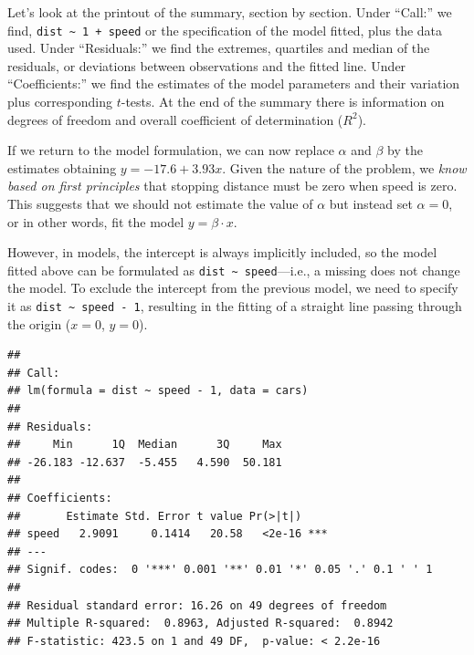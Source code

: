 \documentclass[krantz2]{krantz}\usepackage{knitr}
\begin{document}
Let's look at the printout of the summary, section by section. Under ``Call:'' we find, \verb|dist ~ 1 + speed| or the specification of the model fitted, plus the data used. Under ``Residuals:'' we find the extremes, quartiles and median of the residuals, or deviations between observations and the fitted line. Under ``Coefficients:'' we find the estimates of the model parameters and their variation plus corresponding $t$-tests. At the end of the summary there is information on degrees of freedom and overall coefficient of determination ($R^2$).

If we return to the model formulation, we can now replace $\alpha$ and $\beta$ by the estimates obtaining $y = -17.6 + 3.93 x$. Given the nature of the problem, we \emph{know based on first principles} that stopping distance must be zero when speed is zero. This suggests that we should not estimate the value of $\alpha$ but instead set $\alpha = 0$, or in other words, fit the model $y = \beta \cdot x$.

However, in \Rlang models, the intercept is always implicitly included, so the model fitted above can be formulated as \verb|dist ~ speed|---i.e., a missing  does not change the model. To exclude the intercept from the previous model, we need to specify it as \verb|dist ~ speed - 1|, resulting in the fitting of a straight line passing through the origin ($x = 0$, $y = 0$).

\begin{knitrout}\footnotesize
{}\color{fgcolor}\begin{kframe}
\begin{alltt}
 \hlkwb{<-}  \hlopt{~}  \hlopt{-} \hlstd{,}  
\end{alltt}
\begin{verbatim}
## 
## Call:
## lm(formula = dist ~ speed - 1, data = cars)
## 
## Residuals:
##     Min      1Q  Median      3Q     Max 
## -26.183 -12.637  -5.455   4.590  50.181 
## 
## Coefficients:
##       Estimate Std. Error t value Pr(>|t|)    
## speed   2.9091     0.1414   20.58   <2e-16 ***
## ---
## Signif. codes:  0 '***' 0.001 '**' 0.01 '*' 0.05 '.' 0.1 ' ' 1
## 
## Residual standard error: 16.26 on 49 degrees of freedom
## Multiple R-squared:  0.8963,	Adjusted R-squared:  0.8942 
## F-statistic: 423.5 on 1 and 49 DF,  p-value: < 2.2e-16
\end{verbatim}
\end{kframe}
\end{knitrout}
\end{document}
